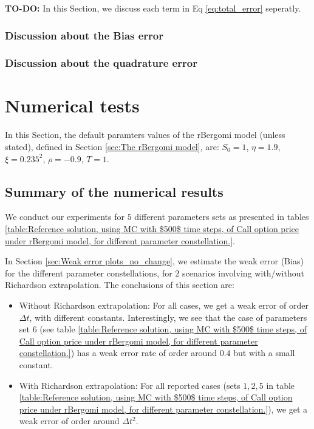 \documentclass[11pt]{article}
\begin{document}
\textbf{TO-DO:} In this Section, we discuss each term in Eq \ref{eq:total_error} seperatly.
\subsubsection{Discussion about the Bias error}
\subsubsection{Discussion about the quadrature error}

\section{Numerical tests}\label{sec:Numerical tests}
In this Section, the default paramters values of the rBergomi model  (unless stated), defined in Section \ref{sec:The rBergomi model}, are: $S_0=1$, $\eta=1.9$, $\xi=0.235^2$, $\rho=-0.9$, $T=1$. 

\subsection{Summary of the numerical results}

We conduct our experiments for $5$ different parameters  sets as presented in tables \ref{table:Reference solution, using MC with $500$ time steps, of Call option price under rBergomi model, for different parameter constellation.}. 

In Section \ref{sec:Weak error plots_no_change}, we estimate the weak error  (Bias) for the different parameter constellations, for $2$ scenarios involving with/without  Richardson extrapolation. The conclusions of this section are: 
\begin{itemize}
	\item Without Richardson extrapolation: For all cases, we get a weak error of order $\Delta t$, with different  constants. Interestingly, we see that the case of parameters set $6$ (see table \ref{table:Reference solution, using MC with $500$ time steps, of Call option price under rBergomi model, for different parameter constellation.}) has a weak error rate of order around $0.4$ but with a small constant. 
	
		\item With Richardson extrapolation: For all reported cases (sets  $1,2,5$ in table \ref{table:Reference solution, using MC with $500$ time steps, of Call option price under rBergomi model, for different parameter constellation.}), we get a weak error of order around  $\Delta t^2$. 
\end{itemize}
\end{document}
